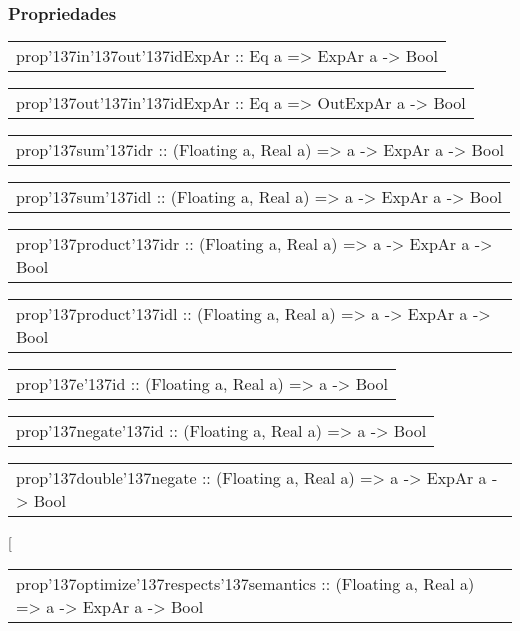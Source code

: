\subsubsection{Propriedades}
\begin{haddockdesc}
\item[\begin{tabular}{@{}l}
prop{\char '137}in{\char '137}out{\char '137}idExpAr :: Eq a => ExpAr a -> Bool
\end{tabular}]
\item[\begin{tabular}{@{}l}
prop{\char '137}out{\char '137}in{\char '137}idExpAr :: Eq a => OutExpAr a -> Bool
\end{tabular}]
\item[\begin{tabular}{@{}l}
prop{\char '137}sum{\char '137}idr :: (Floating a, Real a) => a -> ExpAr a -> Bool
\end{tabular}]
\item[\begin{tabular}{@{}l}
prop{\char '137}sum{\char '137}idl :: (Floating a, Real a) => a -> ExpAr a -> Bool
\end{tabular}]
\item[\begin{tabular}{@{}l}
prop{\char '137}product{\char '137}idr :: (Floating a, Real a) => a -> ExpAr a -> Bool
\end{tabular}]
\item[\begin{tabular}{@{}l}
prop{\char '137}product{\char '137}idl :: (Floating a, Real a) => a -> ExpAr a -> Bool
\end{tabular}]
\item[\begin{tabular}{@{}l}
prop{\char '137}e{\char '137}id :: (Floating a, Real a) => a -> Bool
\end{tabular}]
\item[\begin{tabular}{@{}l}
prop{\char '137}negate{\char '137}id :: (Floating a, Real a) => a -> Bool
\end{tabular}]
\item[\begin{tabular}{@{}l}
prop{\char '137}double{\char '137}negate :: (Floating a, Real a) => a -> ExpAr a -> Bool
\end{tabular}]
\item[\begin{tabular}{@{}l}
prop{\char '137}optimize{\char '137}respects{\char '137}semantics :: (Floating a, Real a) => a -> ExpAr a -> Bool

\end{tabular}
\end{haddockdesc}
